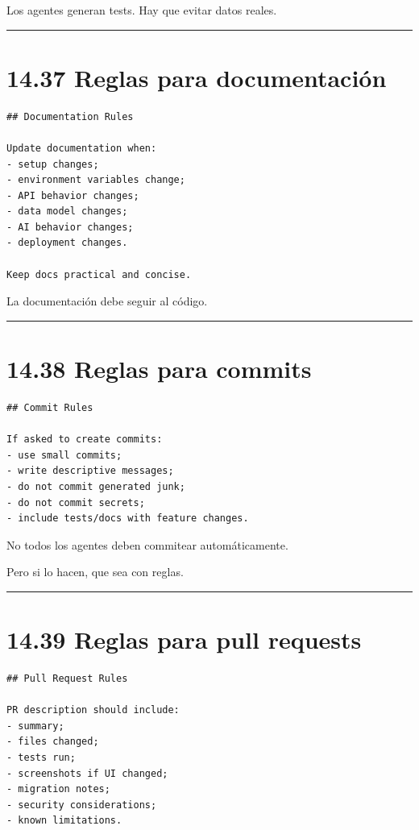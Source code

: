 Los agentes generan tests. Hay que evitar datos reales.

\begin{center}\rule{0.5\linewidth}{0.5pt}\end{center}

\section{14.37 Reglas para
documentación}\label{reglas-para-documentaciuxf3n}

\begin{lstlisting}
## Documentation Rules

Update documentation when:
- setup changes;
- environment variables change;
- API behavior changes;
- data model changes;
- AI behavior changes;
- deployment changes.

Keep docs practical and concise.
\end{lstlisting}

La documentación debe seguir al código.

\begin{center}\rule{0.5\linewidth}{0.5pt}\end{center}

\section{14.38 Reglas para commits}\label{reglas-para-commits}

\begin{lstlisting}
## Commit Rules

If asked to create commits:
- use small commits;
- write descriptive messages;
- do not commit generated junk;
- do not commit secrets;
- include tests/docs with feature changes.
\end{lstlisting}

No todos los agentes deben commitear automáticamente.

Pero si lo hacen, que sea con reglas.

\begin{center}\rule{0.5\linewidth}{0.5pt}\end{center}

\section{14.39 Reglas para pull
requests}\label{reglas-para-pull-requests}

\begin{lstlisting}
## Pull Request Rules

PR description should include:
- summary;
- files changed;
- tests run;
- screenshots if UI changed;
- migration notes;
- security considerations;
- known limitations.
\end{lstlisting}

